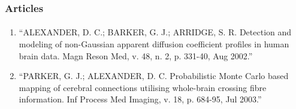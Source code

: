 \documentclass[10pt]{beamer}
\begin{document}
\begin{frame}
  \frametitle{Articles}
  \framesubtitle{}

  \begin{enumerate}
    \item ``ALEXANDER, D. C.; BARKER, G. J.; ARRIDGE, S. R. Detection and modeling of non-Gaussian apparent diffusion coefficient profiles in human brain data. Magn Reson Med, v. 48, n. 2, p. 331-40, Aug 2002.''
    \item ``PARKER, G. J.; ALEXANDER, D. C. Probabilistic Monte Carlo based mapping of cerebral connections utilising whole-brain crossing fibre information. Inf Process Med Imaging, v. 18, p. 684-95, Jul 2003.''
  \end{enumerate}
\end{frame}
\end{document}
